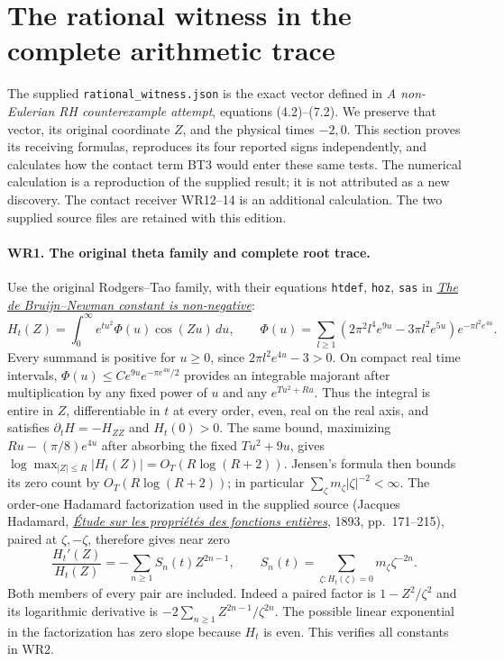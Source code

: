 \section{The rational witness in the complete arithmetic trace}
\label{sec:witness-receiver}

The supplied \texttt{rational\_witness.json} is the exact vector
defined in \emph{A non-Eulerian RH counterexample attempt}, equations
(4.2)--(7.2). We preserve that vector, its original coordinate $Z$,
and the physical times $-2,0$. This section proves its receiving
formulas, reproduces its four reported signs independently, and
calculates how the contact term BT3 would enter these same tests.
The numerical calculation is a reproduction of the supplied result;
it is not attributed as a new discovery. The contact receiver WR12--14
is an additional calculation. The two supplied source files are
retained with this edition.

\paragraph{WR1. The original theta family and complete root trace.}
Use the original Rodgers--Tao family, with their equations
\texttt{htdef}, \texttt{hoz}, \texttt{sas} in
\href{https://arxiv.org/abs/1801.05914v5}{\emph{The de Bruijn--Newman
constant is non-negative}}:
\[
 H_t(Z)=\int_0^\infty e^{tu^2}\Phi(u)\cos(Zu)\,du,\qquad
 \Phi(u)=\sum_{l\ge1}(2\pi^2l^4e^{9u}-3\pi l^2e^{5u})
                         e^{-\pi l^2e^{4u}}.
 \tag{WR1}
\]
Every summand is positive for $u\ge0$, since
$2\pi l^2e^{4u}-3>0$. On compact real time intervals,
$\Phi(u)\le C e^{9u}e^{-\pi e^{4u}/2}$ provides an integrable
majorant after multiplication by any fixed power of $u$ and any
$e^{Tu^2+R u}$. Thus the integral is entire in $Z$, differentiable
in $t$ at every order, even, real on the real axis, and satisfies
$\partial_tH=-H_{ZZ}$ and $H_t(0)>0$.
The same bound, maximizing $Ru-(\pi/8)e^{4u}$ after absorbing
the fixed $Tu^2+9u$, gives
$\log\max_{|Z|\le R}|H_t(Z)|=O_T(R\log(R+2))$.
Jensen's formula then bounds its zero count by $O_T(R\log(R+2))$;
in particular $\sum_\zeta m_\zeta|\zeta|^{-2}<\infty$.
The order-one Hadamard factorization used in the supplied source
(Jacques Hadamard,
\href{https://www.numdam.org/item/JMPA_1893_4_9__171_0/}
{\emph{\'Etude sur les propri\'et\'es des fonctions enti\`eres}},
1893, pp.~171--215),
paired at $\zeta,-\zeta$, therefore gives near zero
\[
 \frac{H_t'(Z)}{H_t(Z)}=-\sum_{n\ge1}S_n(t)Z^{2n-1},\qquad
 S_n(t)=\sum_{\zeta:H_t(\zeta)=0}m_\zeta\zeta^{-2n}.
 \tag{WR2}
\]
Both members of every pair are included. Indeed a paired factor is
$1-Z^2/\zeta^2$ and its logarithmic derivative is
$-2\sum_{n\ge1}Z^{2n-1}/\zeta^{2n}$. The possible linear
exponential in the factorization has zero slope because $H_t$ is
even. This verifies all constants in WR2.

